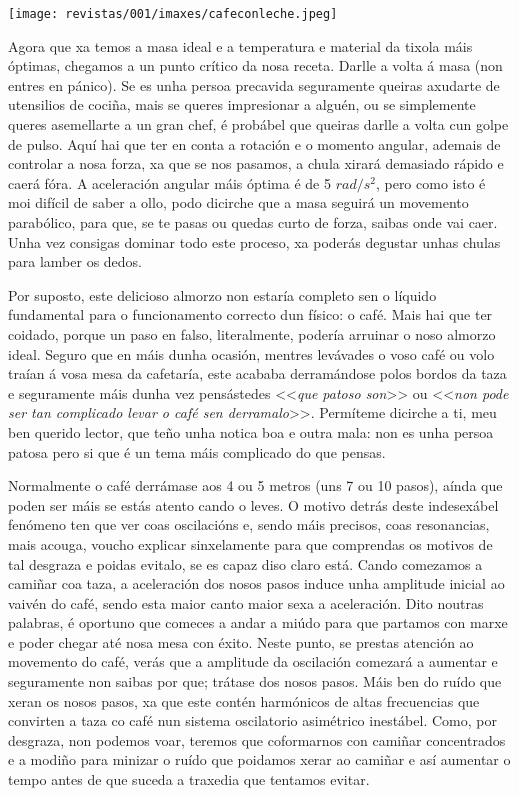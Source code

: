 \begin{multicols}{2}
\begin{center}
    \texttt{[image: revistas/001/imaxes/cafeconleche.jpeg]}
\end{center}

Agora que xa temos a masa ideal e a temperatura e material da tixola máis
óptimas, chegamos a un punto crítico da nosa receta. Darlle a volta á masa (non
entres en pánico). Se es unha persoa precavida seguramente queiras axudarte de
utensilios de cociña, mais se queres impresionar a alguén, ou se simplemente
queres asemellarte a un gran chef, é probábel que queiras darlle a volta cun
golpe de pulso. Aquí hai que ter en conta a rotación e o momento angular,
ademais de controlar a nosa forza, xa que se nos pasamos, a chula xirará
demasiado rápido e caerá fóra. A aceleración angular máis óptima é de 5
$rad/s^2$, pero como isto é moi difícil de saber a ollo, podo dicirche que a
masa seguirá un movemento parabólico, para que, se te pasas ou quedas curto de
forza, saibas onde vai caer. Unha vez consigas dominar todo este proceso, xa
poderás degustar unhas chulas para lamber os dedos.

Por suposto, este delicioso almorzo non estaría completo sen o líquido
fundamental para o funcionamento correcto dun físico: o café. Mais hai que ter
coidado, porque un paso en falso, literalmente, podería arruinar o noso almorzo
ideal. Seguro que en máis dunha ocasión, mentres levávades o voso café ou volo
traían á vosa mesa da cafetaría, este acababa derramándose polos bordos da
taza e seguramente máis dunha vez pensástedes <<\textit{que patoso son}>> ou
<<\textit{non pode ser tan complicado levar o café sen derramalo}>>. Permíteme
dicirche a ti, meu ben querido lector, que teño unha notica boa e outra mala:
non es unha persoa patosa pero si que é un tema máis complicado do que pensas.

Normalmente o café derrámase aos 4 ou 5 metros (uns 7 ou 10 pasos), aínda que
poden ser máis se estás atento cando o leves. O motivo detrás deste indesexábel
fenómeno ten que ver coas oscilacións e, sendo máis precisos, coas resonancias,
mais acouga, voucho explicar sinxelamente para que comprendas os motivos de tal
desgraza e poidas evitalo, se es capaz diso claro está. Cando comezamos a
camiñar coa taza, a aceleración dos nosos pasos induce unha amplitude inicial
ao vaivén do café, sendo esta maior canto maior sexa a aceleración. Dito
noutras palabras, é oportuno que comeces a andar a miúdo para que partamos con
marxe e poder chegar até nosa mesa con éxito. Neste punto, se prestas atención
ao movemento do café, verás que a amplitude da oscilación comezará a aumentar e
seguramente non saibas por que; trátase dos nosos pasos. Máis ben do ruído que
xeran os nosos pasos, xa que este contén harmónicos de altas frecuencias que
convirten a taza co café nun sistema oscilatorio asimétrico inestábel. Como,
por desgraza, non podemos voar, teremos que coformarnos con camiñar
concentrados e a modiño para minizar o ruído que poidamos xerar ao camiñar e así
aumentar o tempo antes de que suceda a traxedia que tentamos evitar.


\end{multicols}
